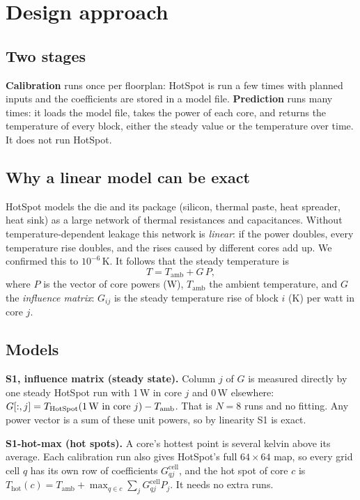 \documentclass[11pt,a4paper]{article}
\begin{document}
\section{Design approach}

\subsection{Two stages}
\textbf{Calibration} runs once per floorplan: HotSpot is run a few times with planned inputs and
the coefficients are stored in a model file. \textbf{Prediction} runs many times: it loads the
model file, takes the power of each core, and returns the temperature of every block, either the
steady value or the temperature over time. It does not run HotSpot.

\subsection{Why a linear model can be exact}
HotSpot models the die and its package (silicon, thermal paste, heat spreader, heat sink) as a
large network of thermal resistances and capacitances. Without temperature-dependent leakage this
network is \emph{linear}: if the power doubles, every temperature rise doubles, and the rises
caused by different cores add up. We confirmed this to $10^{-6}$\,K. It follows that the steady
temperature is
\begin{equation}
  T = T_\text{amb} + G\,P,
  \label{eq:s1}
\end{equation}
where $P$ is the vector of core powers (W), $T_\text{amb}$ the ambient temperature, and $G$ the
\emph{influence matrix}: $G_{ij}$ is the steady temperature rise of block $i$ (K) per watt in
core $j$.

\subsection{Models}
\textbf{S1, influence matrix (steady state).} Column $j$ of $G$ is measured directly by one steady
HotSpot run with 1\,W in core $j$ and 0\,W elsewhere:
$G[:,j] = T_\text{HotSpot}(\text{1\,W in core } j) - T_\text{amb}$. That is $N = 8$ runs and no
fitting. Any power vector is a sum of these unit powers, so by linearity S1 is exact.

\textbf{S1-hot-max (hot spots).} A core's hottest point is several kelvin above its average. Each
calibration run also gives HotSpot's full $64\times64$ map, so every grid cell $q$ has its own row
of coefficients $G^\text{cell}_{qj}$, and the hot spot of core $c$ is
$T_\text{hot}(c) = T_\text{amb} + \max_{q\in c} \sum_j G^\text{cell}_{qj} P_j$. It needs no
extra runs.
\end{document}
